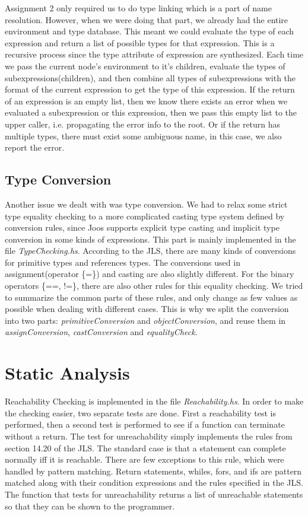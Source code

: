 \documentclass[12pt,letterpaper]{article}
\begin{document}
Assignment 2 only required us to do type linking which is a part of name resolution.
However, when we were doing that part, we already had the entire environment and type database.
This meant we could evaluate the type of each expression and return a list of possible types for that expression.
This is a recursive process since the type attribute of expression are synthesized.
Each time we pass the current node's environment to it's children, evaluate the types of subexpressions(children), and then combine all types of subexpressions with the format of the current expression to get the type of this expression.
If the return of an expression is an empty list, then we know there exists an error when we evaluated a subexpression or this expression, then we pass this empty list to the upper caller, i.e. propagating the error info to the root.
Or if the return has multiple types, there must exist some ambiguous name, in this case, we also report the error.

\subsection{Type Conversion}

Another issue we dealt with was type conversion.
We had to relax some strict type equality checking to a more complicated casting type system defined by conversion rules, since Joos supports explicit type casting and implicit type conversion in some kinds of expressions.
This part is mainly implemented in the file \emph{TypeChecking.hs}.
According to the JLS, there are many kinds of conversions for primitive types and references types.
The conversions used in assignment(operator \{=\}) and casting are also slightly different.
For the binary operators \{==, !=\}, there are also other rules for this equality checking.
We tried to summarize the common parts of these rules, and only change as few values as possible when dealing with different cases.
This is why we split the conversion into two parts: \emph{primitiveConversion} and \emph{objectConversion}, and reuse them in \emph{assignConversion}, \emph{castConversion} and \emph{equalityCheck}.


\section{Static Analysis}

Reachability Checking is implemented in the file \emph{Reachability.hs}.
In order to make the checking easier, two separate tests are done.
First a reachability test is performed, then a second test is performed to see if a function can terminate without a return.
The test for unreachability simply implements the rules from section 14.20 of the JLS.
The standard case is that a statement can complete normally iff it is reachable.
There are few exceptions to this rule, which were handled by pattern matching.
Return statements, whiles, fors, and ifs are pattern matched along with their condition expressions and the rules specified in the JLS.
The function that tests for unreachability returns a list of unreachable statements so that they can be shown to the programmer.
\end{document}
